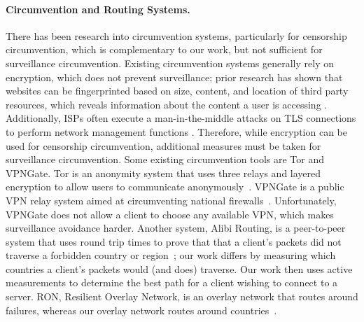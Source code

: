 \paragraph{Circumvention and Routing Systems.}  There has been research into
circumvention systems, particularly for censorship circumvention, which is 
complementary to our work, but not sufficient for surveillance circumvention.  
Existing circumvention systems generally rely on encryption, which does not 
prevent surveillance; prior research has shown that websites can be 
fingerprinted based on size, content, and location of third party resources, which 
reveals information about the content a user is accessing \cite{what_isps_can_see}.  Additionally, 
ISPs often execute a man-in-the-middle attacks on TLS connections to perform 
network management functions \cite{mitm_isp}.  Therefore, while encryption can be 
used for censorship circumvention, additional measures must be taken for 
surveillance circumvention.  Some existing circumvention tools are Tor and VPNGate.
Tor is an anonymity system that uses three relays and layered encryption
to allow users to communicate anonymously~\cite{dingledine2004tor}.
VPNGate is a public VPN relay system aimed at circumventing national
firewalls~\cite{nobori2014vpn}.  Unfortunately, VPNGate does not allow a
client to choose any available VPN, which makes surveillance avoidance
harder.  Another system, Alibi Routing, is a peer-to-peer system that 
uses round trip times to prove that that a client's packets did 
not traverse a forbidden country or region~\cite{levin2015alibi}; our work differs by measuring 
which countries a client's packets would (and does) traverse.  Our work then 
uses active measurements to determine the best path for a client wishing 
to connect to a server.  RON, Resilient Overlay Network, is an overlay network that 
routes around failures, whereas our overlay network routes around countries~\cite{andersen2001resilient}.

